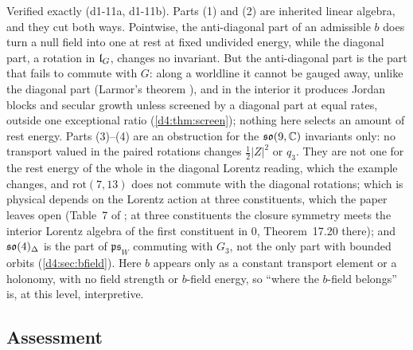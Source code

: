 Verified exactly (d1-11a, d1-11b). Parts (1) and (2) are inherited linear algebra, and they cut both ways. Pointwise, the anti-diagonal part of an
admissible $b$ does turn a null field into one at rest at fixed undivided energy, while the diagonal part, a rotation in $\mathfrak l_G$, changes no invariant.
But the anti-diagonal part is the part that fails to commute with $G$: along a worldline it cannot be gauged away, unlike the diagonal part
(Larmor's theorem \cite{Larmor1897}), and in the interior it produces Jordan blocks and secular growth unless screened by a diagonal part at equal rates, outside one
exceptional ratio (\cref{d4:thm:screen});
nothing here selects an amount of rest energy. Parts (3)--(4) are an obstruction for the $\mathfrak{so}(9,\mathbb{C})$ invariants only: no
transport valued in the paired rotations changes $\tfrac12|Z|^2$ or $q_3$. They are not one for the rest energy of the whole in the diagonal Lorentz
reading, which the example changes, and $\mathrm{rot}(7,13)$ does not commute with the diagonal rotations; which is physical depends on the Lorentz
action at three constituents, which the paper leaves open (Table~7 of \cite{ES17}; at three constituents the closure symmetry meets the
interior Lorentz algebra of the first constituent in $0$, Theorem~17.20 there); and $\mathfrak{so}(4)_\Delta$ is the part of $\mathfrak{ps}_W$ commuting with $G_3$,
not the only part with bounded orbits (\cref{d4:sec:bfield}). Here $b$ appears only as a constant transport element or a holonomy, with no field
strength or $b$-field energy, so ``where the $b$-field belongs'' is, at this level, interpretive.

\subsection{Assessment}
\label{d1:sec:assess}

